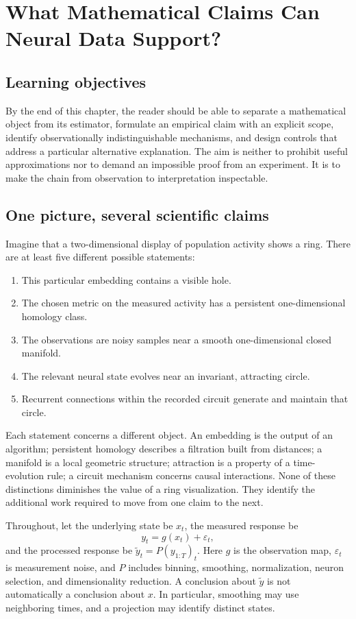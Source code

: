 \chapter{What Mathematical Claims Can Neural Data Support?}\label{ch:12}

\section*{Learning objectives}
By the end of this chapter, the reader should be able to separate a mathematical object from its estimator, formulate an empirical claim with an explicit scope, identify observationally indistinguishable mechanisms, and design controls that address a particular alternative explanation. The aim is neither to prohibit useful approximations nor to demand an impossible proof from an experiment. It is to make the chain from observation to interpretation inspectable.

\section{One picture, several scientific claims}
Imagine that a two-dimensional display of population activity shows a ring. There are at least five different possible statements:
\begin{enumerate}
\item This particular embedding contains a visible hole.
\item The chosen metric on the measured activity has a persistent one-dimensional homology class.
\item The observations are noisy samples near a smooth one-dimensional closed manifold.
\item The relevant neural state evolves near an invariant, attracting circle.
\item Recurrent connections within the recorded circuit generate and maintain that circle.
\end{enumerate}
Each statement concerns a different object. An embedding is the output of an algorithm; persistent homology describes a filtration built from distances; a manifold is a local geometric structure; attraction is a property of a time-evolution rule; a circuit mechanism concerns causal interactions. None of these distinctions diminishes the value of a ring visualization. They identify the additional work required to move from one claim to the next.

Throughout, let the underlying state be \(x_t\), the measured response be
\begin{equation}\label{eq:12-observation}
y_t=g(x_t)+\varepsilon_t,
\end{equation}
and the processed response be \(\widetilde y_t=P(y_{1:T})_t\). Here \(g\) is the observation map, \(\varepsilon_t\) is measurement noise, and \(P\) includes binning, smoothing, normalization, neuron selection, and dimensionality reduction. A conclusion about \(\widetilde y\) is not automatically a conclusion about \(x\). In particular, smoothing may use neighboring times, and a projection may identify distinct states.

